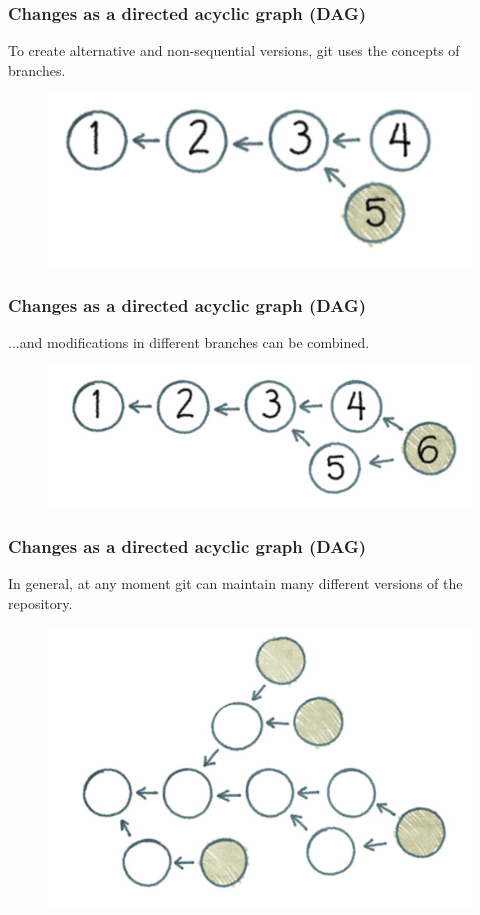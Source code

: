 \documentclass{beamer}
\begin{document}
\begin{frame}
\frametitle{Changes as a directed acyclic graph (DAG)}

To create alternative and non-sequential versions, git uses the
concepts of branches.
\begin{figure}
\includegraphics[scale=0.3]{figures/f10.png}
\end{figure}

\end{frame}

\begin{frame}
\frametitle{Changes as a directed acyclic graph (DAG)}

...and modifications in different branches can be combined.
\begin{figure}
\includegraphics[scale=0.3]{figures/f11.png}
\end{figure}

\end{frame}


\begin{frame}
\frametitle{Changes as a directed acyclic graph (DAG)}

In general, at any moment git can maintain many different versions of
the repository.
\begin{figure}
\includegraphics[scale=0.25]{figures/f12.png}
\end{figure}

\end{frame}
\end{document}
